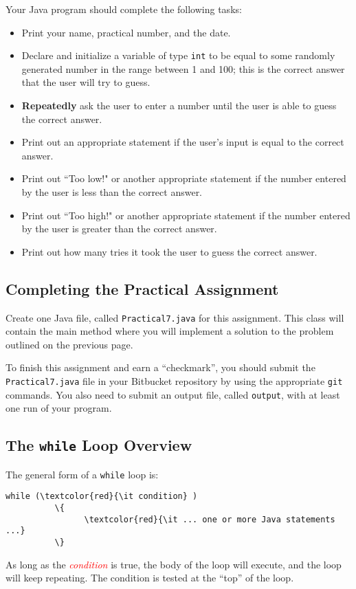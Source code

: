 Your Java program should complete the following tasks:
\begin{itemize}
\item Print your name, practical number, and the date.
\item
Declare and initialize a variable of type {\tt int} to be equal to some
randomly generated number in the range between 1 and 100; this is the correct answer that the user will try to guess.
\item
\textbf{Repeatedly} ask the user to enter a number until the user is able to guess the correct answer.
\item
Print out an appropriate statement if the user's input is equal to the correct answer.
\item
Print out ``Too low!" or another appropriate statement if the number entered by the user is less than the correct answer.
\item
Print out ``Too high!" or another appropriate statement if the number entered by the user is greater than the correct answer.
\item Print out how many tries it took the user to guess the correct answer.
\end{itemize}

\vspace*{-.1in}
\subsection*{Completing the Practical Assignment}
\vspace*{-.1in}
Create one Java file, called {\tt Practical7.java} for this assignment.
This class will contain the main method where you will implement a
solution to the problem outlined on the previous page.

\noindent To finish this assignment and earn a ``checkmark'', you should submit the
{\tt Practical7.java} file in your Bitbucket repository by using
the appropriate {\tt git} commands. You also need to submit an output file,
called {\tt output}, with at least one run of your program.

\vspace{-0.1in}
\subsection*{The {\tt while} Loop Overview}
\vspace*{-.05in}
The general form of a {\tt while} loop is:
\begin{Verbatim}[commandchars=\\\{\}]
          while (\textcolor{red}{\it condition} )
          \{
                \textcolor{red}{\it ... one or more Java statements ...}
          \}
\end{Verbatim}
\vspace{-0.15in}
As long as the \textcolor{red}{\it condition} is true, the body of the loop
will execute, and the loop will
keep repeating. The condition is tested at the ``top'' of the loop.

